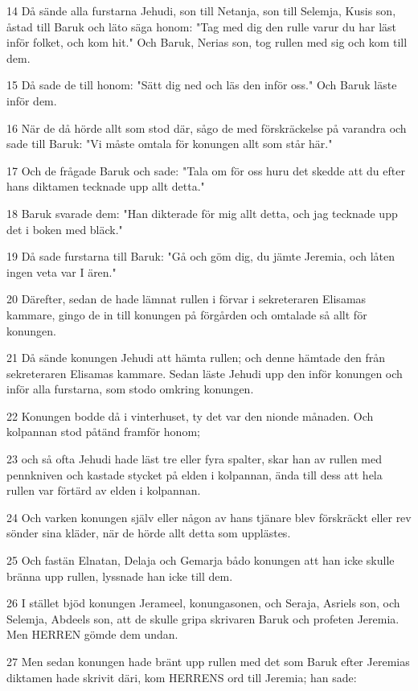 \par 14 Då sände alla furstarna Jehudi, son till Netanja, son till Selemja, Kusis son, åstad till Baruk och läto säga honom: "Tag med dig den rulle varur du har läst inför folket, och kom hit." Och Baruk, Nerias son, tog rullen med sig och kom till dem.
\par 15 Då sade de till honom: "Sätt dig ned och läs den inför oss." Och Baruk läste inför dem.
\par 16 När de då hörde allt som stod där, sågo de med förskräckelse på varandra och sade till Baruk: "Vi måste omtala för konungen allt som står här."
\par 17 Och de frågade Baruk och sade: "Tala om för oss huru det skedde att du efter hans diktamen tecknade upp allt detta."
\par 18 Baruk svarade dem: "Han dikterade för mig allt detta, och jag tecknade upp det i boken med bläck."
\par 19 Då sade furstarna till Baruk: "Gå och göm dig, du jämte Jeremia, och låten ingen veta var I ären."
\par 20 Därefter, sedan de hade lämnat rullen i förvar i sekreteraren Elisamas kammare, gingo de in till konungen på förgården och omtalade så allt för konungen.
\par 21 Då sände konungen Jehudi att hämta rullen; och denne hämtade den från sekreteraren Elisamas kammare. Sedan läste Jehudi upp den inför konungen och inför alla furstarna, som stodo omkring konungen.
\par 22 Konungen bodde då i vinterhuset, ty det var den nionde månaden. Och kolpannan stod påtänd framför honom;
\par 23 och så ofta Jehudi hade läst tre eller fyra spalter, skar han av rullen med pennkniven och kastade stycket på elden i kolpannan, ända till dess att hela rullen var förtärd av elden i kolpannan.
\par 24 Och varken konungen själv eller någon av hans tjänare blev förskräckt eller rev sönder sina kläder, när de hörde allt detta som upplästes.
\par 25 Och fastän Elnatan, Delaja och Gemarja bådo konungen att han icke skulle bränna upp rullen, lyssnade han icke till dem.
\par 26 I stället bjöd konungen Jerameel, konungasonen, och Seraja, Asriels son, och Selemja, Abdeels son, att de skulle gripa skrivaren Baruk och profeten Jeremia. Men HERREN gömde dem undan.
\par 27 Men sedan konungen hade bränt upp rullen med det som Baruk efter Jeremias diktamen hade skrivit däri, kom HERRENS ord till Jeremia; han sade:
